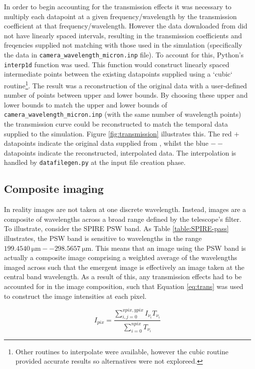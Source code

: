 \documentclass{report}
\begin{document}
In order to begin accounting for the transmission effects it was necessary to multiply each datapoint at a given frequency/wavelength by the transmission coefficient at that frequency/wavelength. However the data downloaded from \textcite{pass} did not have linearly spaced intervals, resulting in the transmission coefficients and freqencies supplied not matching with those used in the simulation (specifically the data in \texttt{camera\_wavelength\_micron.inp} file). To account for this, Python's \texttt{interp1d} function was used. This function would construct linearly spaced intermediate points between the existing datapoints supplied using a `cubic` routine\footnote{Other routines to interpolate were available, however the cubic routine provided accurate results so alternatives were not exploreed.}. The result was a reconstruction of the original data with a user-defined number of points between upper and lower bounds. By choosing these upper and lower bounds to match the upper and lower bounds of \texttt{camera\_wavelength\_micron.inp} (with the same number of wavelength points) the transmission curve could be reconstructed to match the temporal data supplied to the simulation. Figure \ref{fig:transmission} illustrates this. The red $+$ datapoints indicate the original data supplied from \textcite{pass}, whilst the blue $--$ datapoints indicate the reconstructed, interpolated data. The interpolation is handled by \texttt{datafilegen.py} at the input file creation phase.

\subsection{Composite imaging} \label{comp}
In reality images are not taken at one discrete wavelength. Instead, images are a composite of wavelengths across a broad range defined by the telescope's filter. To illustrate, consider the SPIRE PSW band. As Table \ref{table:SPIRE-pass} illustrates, the PSW band is sensitive to wavelengths in the range $\SI{199.4540}{\micro\meter} --	\SI{298.5657}{\micro\meter}$. This means that an image using the PSW band is actually a composite image comprising a weighted average of the wavelengths imaged across such that the emergent image is effectively an image taken at the central band wavelength. As a result of this, any transmission effects had to be accounted for in the image composition, such that Equation \ref{eq:trans} was used to construct the image intensities at each pixel.

\begin{equation}
  I_{pix} = \frac{\sum_{i,j=0}^{xpix,ypix} I_{\nu_i} T_{\nu_i}}{\sum_{i=0}^{npix} T_{\nu_i}}
\end{equation}\label{eq:trans}
\end{document}
